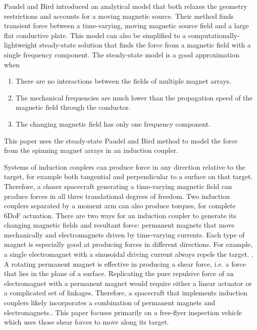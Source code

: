 Paudel and Bird introduced an analytical model that both relaxes the geometry restrictions and accounts for a moving magnetic source. Their method finds transient force between a time-varying, moving magnetic source field and a large flat conductive plate. \cite{Paudel2012t}
This model can also be simplified to a computationally-lightweight steady-state solution that finds the force from a magnetic field with a single frequency component. \cite{Paudel2012ss}
The steady-state model is a good approximation when 
\begin{enumerate}
\item There are no interactions between the fields of multiple magnet arrays. 
\item The mechanical frequencies are much lower than the propagation speed of the magnetic field through the conductor.
\item The changing magnetic field has only one frequency component.
\end{enumerate}
This paper uses the steady-state Paudel and Bird method to model the force from the spinning magnet arrays in an induction coupler. 
 
Systems of induction couplers can produce force in any direction relative to the target, for example both tangential and perpendicular to a surface on that target. Therefore, a chaser spacecraft generating a time-varying magnetic field can produce forces in all three translational degrees of freedom. Two induction couplers separated by a moment arm can also produce torques, for complete 6DoF actuation.
There are two ways for an induction coupler to generate its changing magnetic fields and resultant force: permanent magnets that move mechanically and electromagnets driven by time-varying currents. Each type of magnet is especially good at producing forces in different directions. For example, a single electromagnet with a sinusoidal driving current always repels the target. \cite{Reinhardt2012}.  A rotating permanent magnet is effective in producing a shear force, i.e. a force that lies in the plane of a surface.  Replicating the pure repulsive force of an electromagnet with a permanent magnet would require either a linear actuator or a complicated set of linkages. Therefore, a spacecraft that implements induction couplers likely incorporates a combination of permanent magnets and electromagnets..  This paper focuses primarily on a free-flyer inspection vehicle which uses those shear forces to move along its target. 